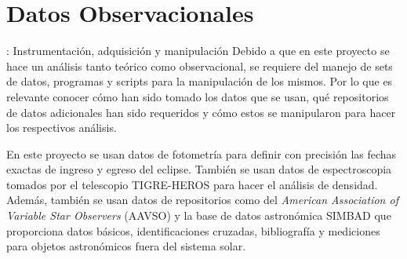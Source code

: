 \documentclass[12pt,oneside,openany,letter]{book}
\begin{document}

\chapter{Datos Observacionales} : Instrumentación, adquisición y manipulación \label{cap3}
Debido a que en este proyecto se hace un análisis tanto teórico como observacional, se requiere del manejo de sets de datos, programas y scripts para la manipulación de los mismos. Por lo que es relevante conocer cómo han sido tomado los datos que se usan, qué repositorios de datos adicionales han sido requeridos y cómo estos se manipularon para hacer los respectivos análisis.

\noindent En este proyecto se usan datos de fotometría para definir con precisión las fechas exactas de ingreso y egreso del eclipse. También se usan datos de espectroscopia tomados por el telescopio TIGRE-HEROS para hacer el análisis de densidad. Además, también se usan datos de repositorios como del \textit{American Association of Variable Star Observers} (AAVSO) y la base de datos astronómica SIMBAD que proporciona datos básicos, identificaciones cruzadas, bibliografía y mediciones para objetos astronómicos fuera del sistema solar.
\end{document}
